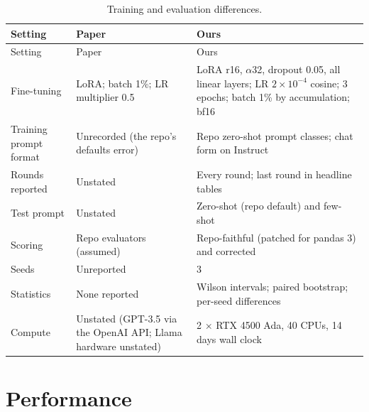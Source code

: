 {\small
{}
\begin{longtable}{@{}p{3.6cm}p{4.6cm}p{6.4cm}@{}}
\caption{Training and evaluation differences.}\label{tab:train-diff}\\
\toprule\rowcolor{headshade}Setting & Paper & Ours\\\midrule\endfirsthead
\toprule\rowcolor{headshade}Setting & Paper & Ours\\\midrule\endhead
\bottomrule\endfoot
Fine-tuning & LoRA; batch 1\%; LR multiplier 0.5 & LoRA r16, $\alpha$32, dropout 0.05, all linear layers; LR
$2\times10^{-4}$ cosine; 3 epochs; batch 1\% by accumulation; bf16\\
Training prompt format & Unrecorded (the repo's defaults error) & Repo zero-shot prompt classes; chat form on Instruct\\
Rounds reported & Unstated & Every round; last round in headline tables\\
Test prompt & Unstated & Zero-shot (repo default) and few-shot\\
Scoring & Repo evaluators (assumed) & Repo-faithful (patched for pandas 3) and corrected\\
Seeds & Unreported & 3\\
Statistics & None reported & Wilson intervals; paired bootstrap; per-seed differences\\
Compute & Unstated (GPT-3.5 via the OpenAI API; Llama hardware unstated) & 2 $\times$ RTX 4500 Ada, 40 CPUs, 14 days
wall clock\\
\end{longtable}
}

\section{Performance}\label{sec:perf-compare}

